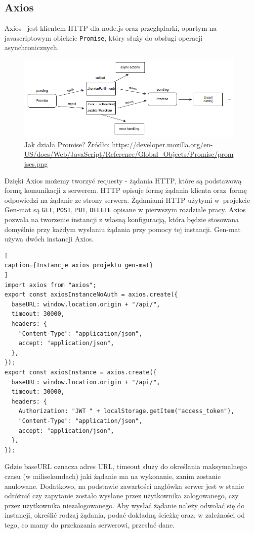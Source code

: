 \documentclass[oneside,polski,logo,indent]{amuthesis}
\begin{document}
\subsection{Axios}
Axios~\cite{axios} jest klientem HTTP dla node.js oraz przeglądarki, opartym na javascriptowym obiekcie \texttt{Promise}, który służy do obsługi operacji asynchronicznych.
\begin{figure}[H]
\centering
\includegraphics[width=13cm]{promises.png}
\caption{Jak działa Promise?
\newline
Źródło: \url{https://developer.mozilla.org/en-US/docs/Web/JavaScript/Reference/Global_Objects/Promise/promises.png}
}
\label{react dev example.jpg}
\end{figure}
Dzięki Axios możemy tworzyć requesty - żądania HTTP, które są podstawową formą komunikacji z serwerem. HTTP opisuje formę żądania klienta oraz~formę odpowiedzi na żądanie ze strony serwera. Żądaniami HTTP użytymi w~projekcie Gen-mat są \texttt{GET}, \texttt{POST}, \texttt{PUT}, \texttt{DELETE} opisane w pierwszym rozdziale pracy.
Axios pozwala na tworzenie instancji z własną konfiguracją, która będzie stosowana domyślnie przy każdym wysłaniu żądania przy pomocy
tej instancji.
Gen-mat używa dwóch instancji Axios.
\begin{lstlisting}[
caption={Instancje axios projektu gen-mat}
]
import axios from "axios";
export const axiosInstanceNoAuth = axios.create({
  baseURL: window.location.origin + "/api/",
  timeout: 30000,
  headers: {
    "Content-Type": "application/json",
    accept: "application/json",
  },
});
export const axiosInstance = axios.create({
  baseURL: window.location.origin + "/api/",
  timeout: 30000,
  headers: {
    Authorization: "JWT " + localStorage.getItem("access_token"),
    "Content-Type": "application/json",
    accept: "application/json",
  },
});
\end{lstlisting}
Gdzie baseURL oznacza adres URL, timeout służy do określania maksymalnego czasu (w milisekundach) jaki żądanie ma na wykonanie, zanim zostanie anulowane. Dodatkowo, na podstawie zawartości nagłówka serwer jest w stanie odróżnić czy zapytanie zostało wysłane przez użytkownika zalogowanego, czy przez użytkownika niezalogowanego. Aby wysłać żądanie należy  odwołać się do instancji, określić rodzaj żądania, podać dokładną ścieżkę oraz, w zależności od tego, co mamy do przekazania serwerowi, przesłać dane.
\end{document}
